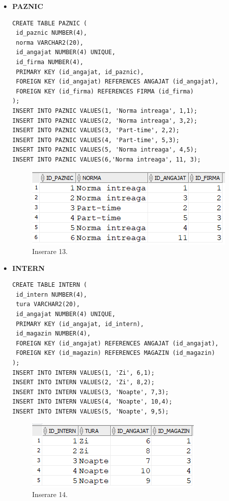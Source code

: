 \begin{itemize}
    \item \textbf{PAZNIC}
    \vspace{0.2cm}
    \begin{lstlisting}
CREATE TABLE PAZNIC (
 id_paznic NUMBER(4),
 norma VARCHAR2(20),
 id_angajat NUMBER(4) UNIQUE,
 id_firma NUMBER(4),
 PRIMARY KEY (id_angajat, id_paznic),
 FOREIGN KEY (id_angajat) REFERENCES ANGAJAT (id_angajat),
 FOREIGN KEY (id_firma) REFERENCES FIRMA (id_firma)
);
INSERT INTO PAZNIC VALUES(1, 'Norma intreaga', 1,1);
INSERT INTO PAZNIC VALUES(2, 'Norma intreaga', 3,2);
INSERT INTO PAZNIC VALUES(3, 'Part-time', 2,2);
INSERT INTO PAZNIC VALUES(4, 'Part-time', 5,3);
INSERT INTO PAZNIC VALUES(5, 'Norma intreaga', 4,5);
INSERT INTO PAZNIC VALUES(6,'Norma intreaga', 11, 3);
    \end{lstlisting}
    \vspace{0.2cm}
    \begin{figure}[h]
      \centerline{\includegraphics{images/inserare13.png}}
      \caption{ Inserare 13.}
    \end{figure}
    \vspace{0.5cm}

    \item \textbf{INTERN}
    \vspace{0.2cm}
    \begin{lstlisting}
CREATE TABLE INTERN (
 id_intern NUMBER(4),
 tura VARCHAR2(20),
 id_angajat NUMBER(4) UNIQUE,
 PRIMARY KEY (id_angajat, id_intern),
 id_magazin NUMBER(4),
 FOREIGN KEY (id_angajat) REFERENCES ANGAJAT (id_angajat),
 FOREIGN KEY (id_magazin) REFERENCES MAGAZIN (id_magazin)
);
INSERT INTO INTERN VALUES(1, 'Zi', 6,1);
INSERT INTO INTERN VALUES(2, 'Zi', 8,2);
INSERT INTO INTERN VALUES(3, 'Noapte', 7,3);
INSERT INTO INTERN VALUES(4, 'Noapte', 10,4);
INSERT INTO INTERN VALUES(5, 'Noapte', 9,5);
    \end{lstlisting}
    \vspace{0.2cm}
    \begin{figure}[h]
      \centerline{\includegraphics{images/inserare14.png}}
      \caption{ Inserare 14.}
    \end{figure}
    \vspace{0.5cm}
\end{itemize}
